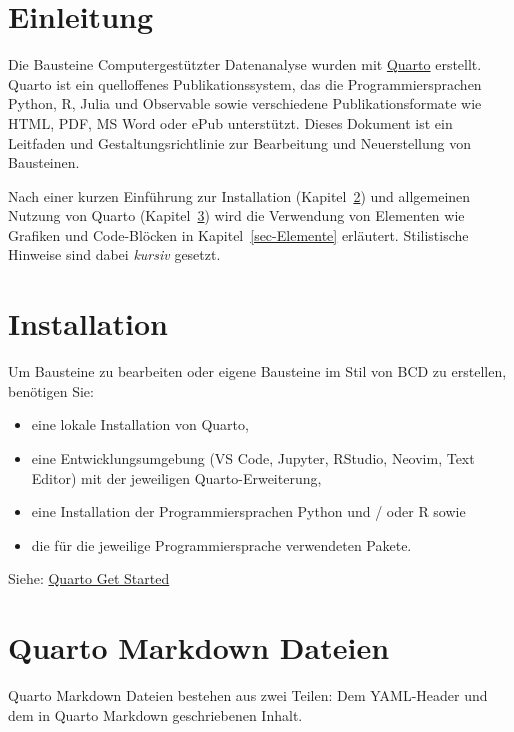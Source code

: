 \documentclass[
  letterpaper,
  DIV=11]{scrartcl}
\providecommand{\tightlist}{%
  \setlength{\itemsep}{0pt}\setlength{\parskip}{0pt}}\usepackage{longtable,booktabs,array}
\begin{document}
\newpage{}

\section{Einleitung}\label{einleitung}

Die Bausteine Computergestützter Datenanalyse wurden mit
\href{https://quarto.org/}{Quarto} erstellt. Quarto ist ein quelloffenes
Publikationssystem, das die Programmiersprachen Python, R, Julia und
Observable sowie verschiedene Publikationsformate wie HTML, PDF, MS Word
oder ePub unterstützt. Dieses Dokument ist ein Leitfaden und
Gestaltungsrichtlinie zur Bearbeitung und Neuerstellung von Bausteinen.

Nach einer kurzen Einführung zur Installation
(Kapitel~\ref{sec-Installation}) und allgemeinen Nutzung von Quarto
(Kapitel~\ref{sec-Quarto-Markdown-Dateien}) wird die Verwendung von
Elementen wie Grafiken und Code-Blöcken in Kapitel~\ref{sec-Elemente}
erläutert. Stilistische Hinweise sind dabei \emph{kursiv} gesetzt.

\section{Installation}\label{sec-Installation}

Um Bausteine zu bearbeiten oder eigene Bausteine im Stil von BCD zu
erstellen, benötigen Sie:

\begin{itemize}
\tightlist
\item
  eine lokale Installation von Quarto,
\item
  eine Entwicklungsumgebung (VS Code, Jupyter, RStudio, Neovim, Text
  Editor) mit der jeweiligen Quarto-Erweiterung,
\item
  eine Installation der Programmiersprachen Python und / oder R sowie
\item
  die für die jeweilige Programmiersprache verwendeten Pakete.
\end{itemize}

Siehe: \href{https://quarto.org/docs/get-started/}{Quarto Get Started}

\section{Quarto Markdown Dateien}\label{sec-Quarto-Markdown-Dateien}

Quarto Markdown Dateien bestehen aus zwei Teilen: Dem YAML-Header und
dem in Quarto Markdown geschriebenen Inhalt.
\end{document}
